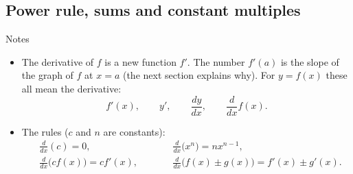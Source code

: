 \documentclass[11pt,a4paper]{article}
\begin{document}
\subsection{Power rule, sums and constant multiples}
\begin{notesbox}{Notes}
\begin{itemize}
 \item The derivative of $f$ is a new function $f'$. The number $f'(a)$ is the slope of the graph of $f$ at $x=a$ (the next section explains why). For $y=f(x)$ these all mean the derivative:
 \[
 f'(x),\qquad y',\qquad \frac{dy}{dx},\qquad \frac{d}{dx}f(x).
 \]
 \item The rules ($c$ and $n$ are constants):
 \[
 \begin{aligned}
 &\frac{d}{dx}(c)=0, &\qquad &\frac{d}{dx}\bigl(x^n\bigr)=nx^{n-1},\\[4pt]
 &\frac{d}{dx}\bigl(cf(x)\bigr)=cf'(x), &\qquad &\frac{d}{dx}\bigl(f(x)\pm g(x)\bigr)=f'(x)\pm g'(x).
 \end{aligned}
 \]
\end{itemize}
\end{notesbox}
\end{document}
